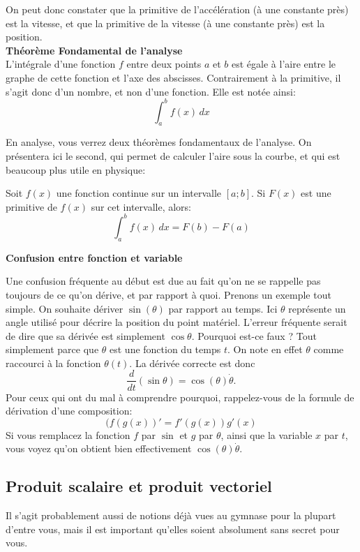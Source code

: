\documentclass{article}
\begin{document}
On peut donc constater que la primitive de l'accélération (à une constante près) est la vitesse, et que la primitive de la vitesse (à une constante près) est la position. \\

\noindent \textbf{Théorème Fondamental de l'analyse}\\
L'intégrale d'une fonction $f$ entre deux points $a$ et $b$ est égale à l'aire entre le graphe de cette fonction et l'axe des abscisses. Contrairement à la primitive, il s'agit donc d'un nombre, et non d'une fonction. Elle est notée ainsi:
\[\int_{a}^{b}f(x) \,dx\]

\noindent En analyse, vous verrez deux théorèmes fondamentaux de l'analyse. On présentera ici le second, qui permet de calculer l'aire sous la courbe, et qui est beaucoup plus utile en physique:
\begin{tcolorbox}[title=Théorème fondamental de l'analyse, enlarge top by=1mm, enlarge bottom by=1mm]
Soit $f(x)$ une fonction continue sur un intervalle $[a;b]$. Si $F(x)$ est une primitive de $f(x)$ sur cet intervalle, alors:
\[\int_{a}^{b}f(x) \,dx = F(b) - F(a)\]
\end{tcolorbox}


\noindent \textbf{Confusion entre fonction et variable}


Une confusion fréquente au début est due au fait qu'on ne se rappelle pas toujours de ce qu'on dérive, et par rapport à quoi. Prenons un exemple tout simple. On souhaite dériver $\sin{(\theta)}$ par rapport au temps. Ici $\theta$ représente un angle utilisé pour décrire la position du point matériel.  L'erreur fréquente serait de dire que sa dérivée est simplement $\cos{\theta}$. Pourquoi est-ce faux ? Tout simplement parce que $\theta$ est une fonction du temps $t$. On note en effet $\theta$ comme raccourci à la fonction $\theta (t)$. La dérivée correcte est donc \[ \frac{d}{dt} (\sin{\theta}) = \cos{(\theta)} \dot{\theta}.\]
Pour ceux qui ont du mal à comprendre pourquoi, rappelez-vous de la formule de dérivation d'une composition: 
\[ (f(g(x))' = f'(g(x)) g'(x) \]
Si vous remplacez la fonction $f$ par $\sin$ et $g$ par $\theta$, ainsi que la variable $x$ par $t$, vous voyez qu'on obtient bien effectivement $\cos{(\theta)} \dot{\theta}.$


\subsection{Produit scalaire et produit vectoriel}
Il s'agit probablement aussi de notions déjà vues au gymnase pour la plupart d'entre vous, mais il est important qu'elles soient absolument sans secret pour vous. 
\end{document}
